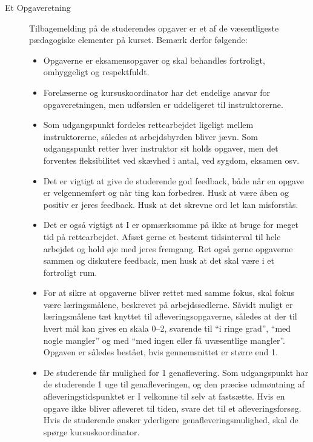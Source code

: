 \documentclass[a4paper]{article}
\begin{document}
\begin{description}
\item[Et Opgaveretning] Tilbagemelding på de studerendes opgaver er et
  af de væsentligeste pædagogiske elementer på kurset. Bemærk derfor
  følgende:
  \begin{itemize}
  \item Opgaverne er eksamensopgaver og skal behandles fortroligt,
    omhyggeligt og respektfuldt.
  \item Forelæserne og kursuskoordinator har det endelige ansvar for
    opgaveretningen, men udførslen er uddeligeret til instruktorerne.
  \item Som udgangspunkt fordeles rettearbejdet ligeligt mellem
    instruktorerne, således at arbejdsbyrden bliver jævn. Som
    udgangspunkt retter hver instruktor sit holds opgaver, men det
    forventes fleksibilitet ved skævhed i antal, ved sygdom, eksamen
    osv.
  \item Det er vigtigt at give de studerende god feedback, både når en
    opgave er velgennemført og når ting kan forbedres. Husk at være
    åben og positiv er jeres feedback. Husk at det skrevne ord let kan
    misforstås.
  \item Det er også vigtigt at I er opmærksomme på ikke at bruge for
    meget tid på rettearbejdet. Afsæt gerne et bestemt tidsinterval
    til hele arbejdet og hold øje med jeres fremgang. Ret også gerne
    opgaverne sammen og diskutere feedback, men husk at det skal være
    i et fortroligt rum.
  \item For at sikre at opgaverne bliver rettet med samme fokus, skal
    fokus være læringsmålene, beskrevet på arbejdssedlerne. Såvidt
    muligt er læringsmålene tæt knyttet til afleveringsopgaverne,
    således at der til hvert mål kan gives en skala 0--2, svarende til
    "`i ringe grad"', "`med nogle mangler"' og med "`med ingen eller
    få uvæsentlige mangler"'. Opgaven er således bestået, hvis
    gennemsnittet er større end 1.
  \item De studerende får mulighed for 1 genaflevering. Som
    udgangspunkt har de studerende 1 uge til genafleveringen, og den
    præcise udmøntning af afleveringstidspunktet er I velkomne til
    selv at fastsætte. Hvis en opgave ikke bliver afleveret til tiden,
    svare det til et afleveringsforsøg. Hvis de studerende ønsker
    yderligere genafleveringsmulighed, skal de spørge
    kursuskoordinator.
  \end{itemize}



\end{description}
\end{document}
